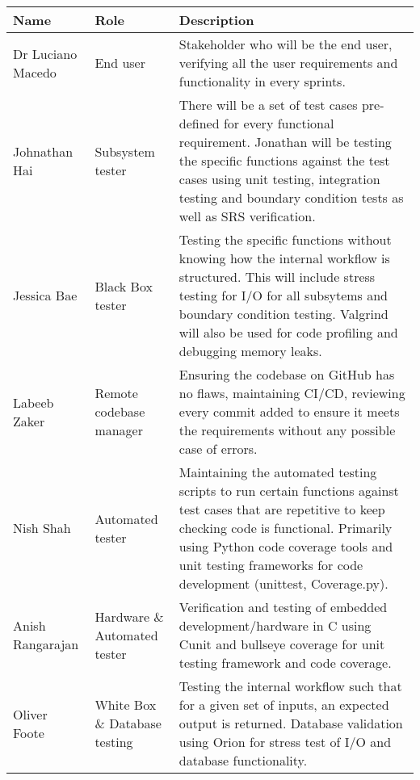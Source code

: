 \documentclass[12pt, titlepage]{article}
\begin{document}
\begin{center}
\begin{tabular}{|m{5em}|m{5em}|m{25em}|}
    \hline
    \label{4_1}\textbf{Name} & \textbf{Role}                 & \textbf{Description}                                                                                                                                                                                                                                                \\
    \hline
    Dr Luciano Macedo        & End user                      & Stakeholder who will be the end user, verifying all the user requirements and functionality in every sprints.                                                                                                                                                       \\
    \hline
    Johnathan Hai            & Subsystem tester              & There will be a set of test cases pre-defined for every functional requirement. Jonathan will be testing the specific functions against the test cases using unit testing, integration testing and boundary condition tests as well as SRS verification.            \\
    \hline
    Jessica Bae              & Black Box tester              & Testing the specific functions without knowing how the internal workflow is structured. This will include stress testing for I/O for all subsytems and boundary condition testing. Valgrind will also be used for code profiling and debugging memory leaks.        \\
    \hline
    Labeeb Zaker             & Remote codebase manager       & Ensuring the codebase on GitHub has no flaws, maintaining CI/CD, reviewing every commit added to ensure it meets the requirements without any possible case of errors.                                                                                              \\
    \hline
    Nish Shah                & Automated tester              & Maintaining the automated testing scripts to run certain functions against test cases that are repetitive to keep checking code is functional. Primarily using Python code coverage tools and unit testing frameworks for code development (unittest, Coverage.py). \\
    \hline
    Anish Rangarajan         & Hardware \& Automated tester  & Verification and testing of embedded development/hardware in C using Cunit and bullseye coverage for unit testing framework and code coverage.                                                                                                                      \\
    \hline
    Oliver Foote             & White Box \& Database testing & Testing the internal workflow such that for a given set of inputs, an expected output is returned. Database validation using Orion for stress test of I/O and database functionality.                                                                               \\
    \hline
  \end{tabular}
\end{center}
\end{document}
